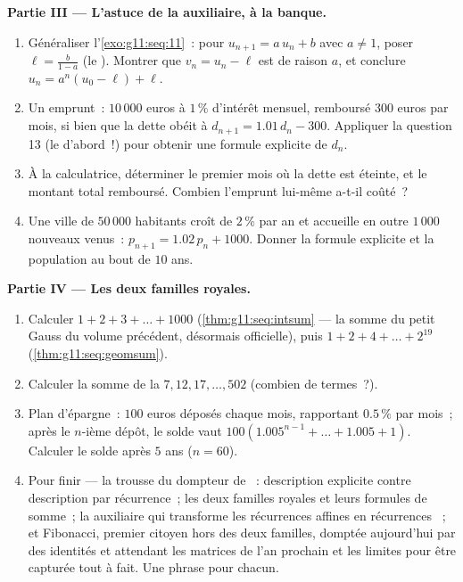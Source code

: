 \begin{problem}
\medskip
\noindent\textbf{Partie III --- L'astuce de la  auxiliaire, à
la banque.}
\begin{enumerate}[resume]
  \item Généraliser l'\cref{exo:g11:seq:11}~: pour
        $u_{n+1} = a\,u_n + b$ avec $a \neq 1$, poser
        $\ell = \frac{b}{1 - a}$ (le ). Montrer que
        $v_n = u_n - \ell$ est  de raison $a$, et
        conclure $u_n = a^n (u_0 - \ell) + \ell$.
  \item Un emprunt~: $10\,000$ euros à $1\,\%$ d'intérêt mensuel,
        remboursé $300$ euros par mois, si bien que la dette obéit à
        $d_{n+1} = 1.01\,d_n - 300$. Appliquer la question 13 (le
         d'abord~!) pour obtenir une formule explicite de
        $d_n$.
  \item À la calculatrice, déterminer le premier mois où la dette
        est éteinte, et le montant total remboursé. Combien
        l'emprunt lui-même a-t-il coûté~?
  \item Une ville de $50\,000$ habitants croît de $2\,\%$ par an et
        accueille en outre $1\,000$ nouveaux venus~:
        $p_{n+1} = 1.02\,p_n + 1000$. Donner la formule explicite et
        la population au bout de $10$ ans.
\end{enumerate}

\medskip
\noindent\textbf{Partie IV --- Les deux familles royales.}
\begin{enumerate}[resume]
  \item Calculer $1 + 2 + 3 + \dots + 1000$
        (\cref{thm:g11:seq:intsum} --- la somme du petit Gauss du
        volume précédent, désormais officielle), puis
        $1 + 2 + 4 + \dots + 2^{19}$
        (\cref{thm:g11:seq:geomsum}).
  \item Calculer la somme de la 
        $7, 12, 17, \dots, 502$ (combien de termes~?).
  \item Plan d'épargne~: $100$ euros déposés chaque mois, rapportant
        $0.5\,\%$ par mois~; après le $n$-ième dépôt, le solde vaut
        $100\left(1.005^{n-1} + \dots + 1.005 + 1\right)$. Calculer
        le solde après $5$ ans ($n = 60$).
  \item Pour finir --- la trousse du dompteur de ~:
        description explicite contre description par récurrence~;
        les deux familles royales et leurs formules de somme~; la
         auxiliaire qui transforme les récurrences affines en
        récurrences ~; et Fibonacci, premier citoyen
        hors des deux familles, domptée aujourd'hui par des
        identités et attendant les matrices de l'an prochain et les
        limites pour être capturée tout à fait. Une phrase pour
        chacun.
\end{enumerate}
\end{problem}
